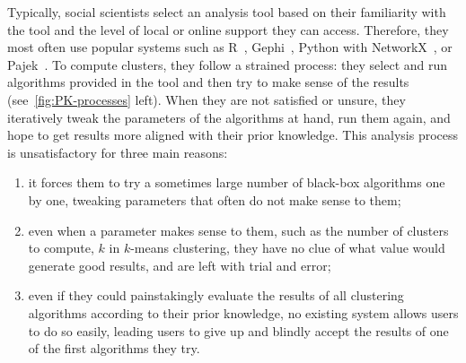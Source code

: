 Typically, social scientists select an analysis tool based on their familiarity with the tool and the level of local or online support they can access.
Therefore, they most often use popular systems such as R~\cite{Rstat}, Gephi~\cite{Gephi}, Python with NetworkX~\cite{networkx}, or Pajek~\cite{pajek}.
To compute clusters, they follow a strained process: they select and run algorithms provided in the tool and then try to make sense of the results (see~\autoref{fig:PK-processes} left).
When they are not satisfied or unsure, they iteratively tweak the parameters of the algorithms at hand, run them again, and hope to get results more aligned with their prior knowledge. This analysis process is unsatisfactory for three main reasons:
\begin{enumerate}
    \item it forces them to try a sometimes large number of black-box algorithms one by one, tweaking parameters that often do not make sense to them; \item even when a parameter makes sense to them, such as the number of clusters to compute, $k$ in $k$-means clustering, they have no clue of what value would generate good results, and are left with trial and error;
    \item even if they could %
    painstakingly evaluate the results of all clustering algorithms  according to their prior knowledge, no existing system allows users to do so easily, leading users to give up and blindly accept the results of one of the first algorithms they try.
\end{enumerate}



